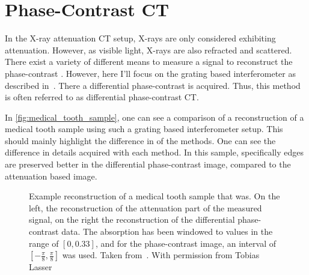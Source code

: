 \section{Phase-Contrast CT}\label{sec:phasecontrast_ct}

In the X-ray attenuation CT setup, X-rays are only considered exhibiting attenuation. However, as
visible light, X-rays are also refracted and scattered. There exist a variety of different means to
measure a signal to reconstruct the phase-contrast . However, here I'll focus on the grating based interferometer as described
in~\cite{pfeiffer_hard-x-ray_2008}. There a differential phase-contrast is acquired. Thus, this
method is often referred to as differential phase-contrast CT\@.

In \autoref{fig:medical_tooth_sample}, one can see a comparison of a reconstruction of a medical
tooth sample using such a grating based interferometer setup. This should mainly highlight the
difference in of the methods. One can see the difference in details acquired with each method. In
this sample, specifically edges are preserved better in the differential phase-contrast image,
compared to the attenuation based image.

\begin{figure}[H]
	\centering
	\caption{Example reconstruction of a medical tooth sample that was. On the left, the
		reconstruction of the attenuation part of the measured signal, on the right the
		reconstruction of the differential phase-contrast data. The absorption has been
		windowed to values in the range of \([0, 0.33]\), and for the phase-contrast image,
		an interval of \([-\frac{\pi}{8}, \frac{\pi}{8}]\) was used. Taken
		from~\cite{wieczorek_anisotropic_2017}. With permission from Tobias Lasser}
	\label{fig:medical_tooth_sample}
\end{figure}


